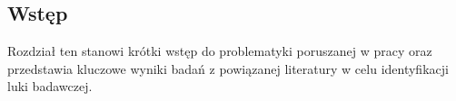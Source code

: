 \subsection{Wstęp}

Rozdział ten stanowi krótki wstęp do problematyki poruszanej w pracy oraz przedstawia kluczowe wyniki badań z powiązanej literatury w celu identyfikacji luki badawczej.
